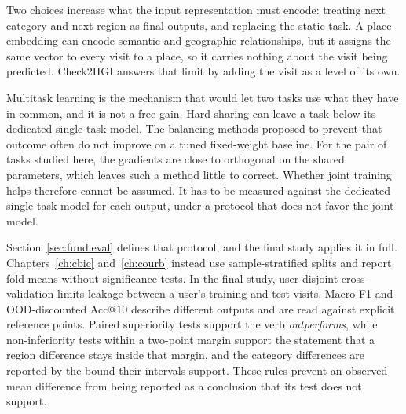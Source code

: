 Two choices increase what the input representation must encode: treating next category
and next region as final outputs, and replacing the static task. A place embedding
can encode semantic and geographic relationships, but it assigns the same vector to
every visit to a place, so it carries nothing about the visit being predicted.
Check2HGI answers that limit by adding the visit as a level of its own.

Multitask learning is the mechanism that would let two tasks use what they have in
common, and it is not a free gain. Hard sharing can leave a task below its dedicated
single-task model. The balancing methods proposed to prevent that outcome often do not
improve on a tuned fixed-weight baseline. For the pair of tasks studied here, the
gradients are close to orthogonal on the shared parameters, which leaves such a method
little to correct. Whether joint training helps therefore cannot be assumed. It has to be
measured against the dedicated single-task model for each output, under a protocol
that does not favor the joint model.

Section~\ref{sec:fund:eval} defines that protocol, and the final study applies it in
full. Chapters~\ref{ch:cbic} and~\ref{ch:courb} instead use sample-stratified splits
and report fold means without significance tests. In the final study, user-disjoint
cross-validation limits leakage between a user's training and test visits. Macro-F1 and OOD-discounted
Acc@10 describe different outputs and are read against explicit reference points.
Paired superiority tests support the verb \emph{outperforms}, while non-inferiority
tests within a two-point margin support the statement that a region difference stays inside that
margin, and the category differences are reported by the bound their intervals support. These rules prevent an
observed mean difference from being reported as a conclusion that its test does not
support.

